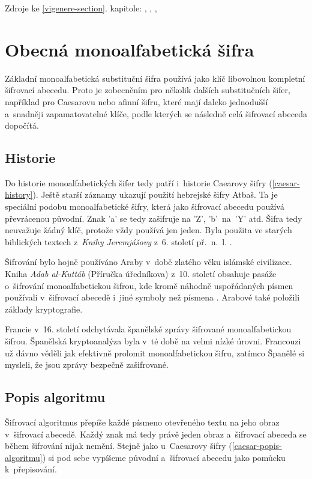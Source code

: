 \documentclass[glossaries, index]{kidiplom}
\begin{document}
\vspace*{\fill}

\noindent
Zdroje ke \ref{vigenere-section}. kapitole: \cite{singh2009}, \cite{vigenerewiki}, \cite{vigenerewiki-en}, \cite{stinson2006}

\newpage


\section{Obecná monoalfabetická šifra}
\label{monoalphabetic-section}
Základní monoalfabetická substituční šifra používá jako klíč libovolnou kompletní šifrovací abecedu. Proto je zobecněním pro několik dalších substitučních šifer, například pro Caesarovu nebo afinní šifru, které mají daleko jednodušší a~snadněji zapamatovatelné klíče, podle kterých se následně celá šifrovací abeceda dopočítá.

\subsection{Historie}
Do historie monoalfabetických šifer tedy patří i~historie Caearovy šifry (\ref{caesar-history}). Ještě starší záznamy ukazují použití hebrejské šifry Atbaš. Ta je speciální podobu monoalfabetické šifry, která jako šifrovací abecedu používá převrácenou původní. Znak 'a' se tedy zašifruje na 'Z', 'b'~na~'Y' atd. Šifra tedy neuvažuje žádný klíč, protože vždy používá jen jeden. Byla použita ve starých biblických textech z~\textit{Knihy Jeremjášovy} z~6. století př.~n.~l. \cite{atbashcipher}.

Šifrování bylo hojně používáno Araby v~době zlatého věku islámské civilizace. Kniha \textit{Adab al-Kuttáb} (Příručka úředníkova) z~10. století obsahuje pasáže o~šifrování monoalfabetickou šifrou, kde kromě náhodně uspořádaných písmen používali v~šifrovací abecedě i~jiné symboly než písmena \cite{singh2009}. Arabové také položili základy kryptografie.

Francie v~16. století odchytávala španělské zprávy šifrované monoalfabetickou šifrou. Španělská kryptoanalýza byla v~té době na velmi nízké úrovni. Francouzi už dávno věděli jak efektivně prolomit monoalfabetickou šifru, zatímco Španělé si mysleli, že jsou zprávy bezpečně zašifrované.

\subsection{Popis algoritmu}
Šifrovací algoritmus přepíše každé písmeno otevřeného textu na jeho obraz v~šifrovací abecedě. Každý znak má tedy právě jeden obraz a~šifrovací abeceda se během šifrování nijak nemění. Stejně jako u~Caesarovy šifry (\ref{caesar-popis-algoritmu}) si pod sebe vypíšeme původní a~šifrovací abecedu jako pomůcku k~přepisování.
\end{document}
